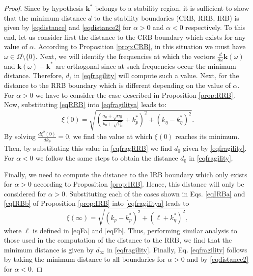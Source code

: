 \documentclass[twoside,reqno,11pt]{fcaa-var} %
\begin{document}
\begin{proof}
	Since by hypothesis $\mathbf{k}^*$ belongs to a stability region, it is sufficient to show that the minimum distance $d$ to the stability boundaries (CRB, RRB, IRB) is given by \eqref{eqdistance} and \eqref{eqdistance2} for $\alpha>0$ and $\alpha<0$ respectively. To this end, let us consider first the distance to the CRB boundary which exists for any value of $\alpha$. According to Proposition \ref{prop:CRB}, in this situation we must have $\omega\in\Omega\setminus\{0\}$. Next, 
	we will identify the frequencies at which the vectors $\frac{d}{d\omega}\mathbf{k}(\omega)$ and $\mathbf{k}(\omega)-\mathbf{k}^*$ are orthogonal since at such frequencies occur the minimum distance. Therefore, $d_\ell$ in \eqref{eqfragility} will compute such a value. Next, for the distance to the RRB boundary which is different depending on the value of $\alpha$. For $\alpha>0$ we have to consider the case  described in Proposition \ref{prop:RRB}. Now, substituting \eqref{eqRRB} into \eqref{eqfragilitya} leads to:
	\begin{equation}
	\xi(0)=\sqrt{{(\tfrac{a_0+\sqrt{\alpha_0}}{b_0+\sqrt{\beta_0}}+k_p^*)}^{2}+{(k_\eta-k_\eta^*)}^{2}}. \label{eqfragRRB}
	\end{equation}
	By solving $\tfrac{d\xi^2(0)}{dk_\eta}=0$, we find the value at which $\xi(0)$ reaches its minimum. Then, by substituting this value in \eqref{eqfragRRB} we find $d_0$ given by \eqref{eqfragility}. For $\alpha<0$ we follow the same steps to obtain the distance $d_0$ in \eqref{eqfragility}.\par 
	Finally, we need to compute the distance to the IRB boundary which only exists for $\alpha>0$ according to Proposition \ref{prop:IRB}. Hence, this distance will only be considered for $\alpha>0$. Substituting each of the cases shown in Eqs. \eqref{eqIRBa} and \eqref{eqIRBb} of Proposition \ref{prop:IRB} into \eqref{eqfragilitya} leads to
	\begin{equation}
	\xi(\infty)=\sqrt{(k_p-k_p^*)^2+(\ell+k_\eta^*)^2}, \label{eqfragilityb}
	\end{equation}
	where $\ell$ is defined in \eqref{eqFa} and \eqref{eqFb}. Thus, performing similar analysis to those used in the computation of the distance to the RRB, we find that the minimum distance is given by $d_\infty$ in \eqref{eqfragility}.
	Finally, Eq. \eqref{eqfragility} follows by taking the minimum distance to all boundaries for $\alpha>0$ and by \eqref{eqdistance2} for $\alpha<0$.

\end{proof}
\end{document}
